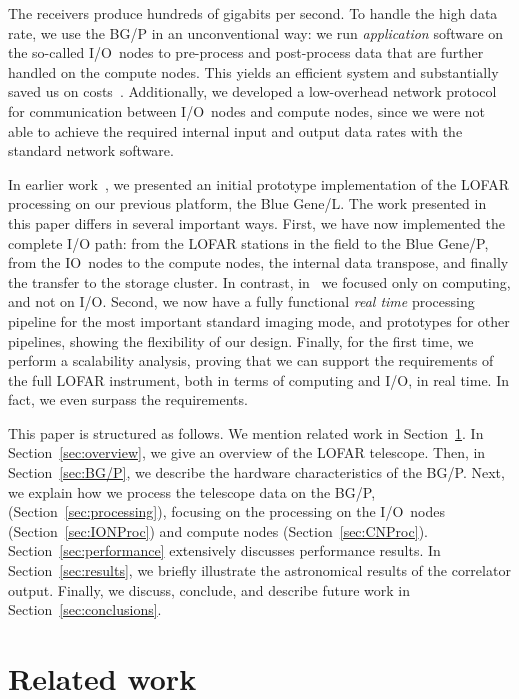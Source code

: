 \documentclass{sig-alternate}
\begin{document}
The receivers produce hundreds of gigabits per second.
To handle the high data rate,
we use the BG/P in an unconventional way: we run
\emph{application\/} software on the so-called I/O~nodes to pre-process and
post-process data that are further handled on the compute nodes.
This yields an efficient system and substantially saved us on
costs~\cite{Iskra:08}.
Additionally, we developed a low-overhead network protocol~\cite{Romein:09a}
for communication between I/O~nodes and compute nodes, since we were not able
to achieve the required internal input and output data rates with the standard
network software.

In earlier work~\cite{Romein:06}, we presented an initial prototype
implementation of the LOFAR processing on our previous platform, the
Blue Gene/L.  The work presented in this paper differs in several
important ways.  First, we have now implemented the complete I/O path:
from the LOFAR stations in the field to the Blue Gene/P, 
from the IO~nodes to the compute nodes, the internal
data transpose, and finally the transfer 
to the storage cluster. In contrast, in~\cite{Romein:06}
we focused only on computing, and not on I/O.
Second, we now have a fully functional \emph{real time} processing pipeline
for the most important standard imaging mode, and prototypes for other
pipelines, showing the flexibility of our design.  Finally, for the
first time, we perform a scalability analysis, proving that we can 
support the requirements of the full LOFAR instrument, both in
terms of computing and I/O, in real time. In fact, we even surpass the
requirements.

This paper is structured as follows.
We mention related work in Section~\ref{sec:related-work}.
In Section~\ref{sec:overview}, we give an overview of the LOFAR telescope.
Then, in Section~\ref{sec:BG/P}, we describe the hardware characteristics of
the BG/P.
Next, we explain how we process the telescope data on the BG/P,
(Section~\ref{sec:processing}), focusing on the processing on the I/O~nodes
(Section~\ref{sec:IONProc}) and compute nodes (Section~\ref{sec:CNProc}).
Section~\ref{sec:performance} extensively discusses performance results.
In Section~\ref{sec:results}, we briefly illustrate the astronomical results
of the correlator output.
Finally, we discuss, conclude, and describe future work in
Section~\ref{sec:conclusions}.



\section{Related work}
\label{sec:related-work}
\end{document}
